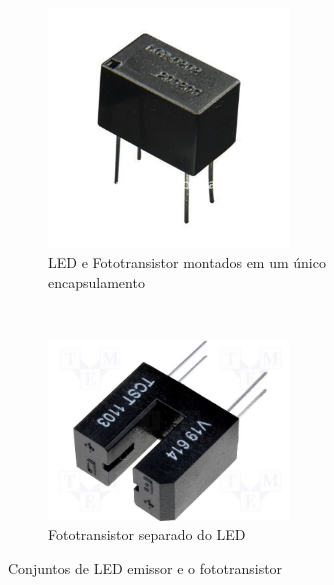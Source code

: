 \begin{figure}
        \centering
        \begin{subfigure}[b]{0.4\textwidth}
                \includegraphics[width=0.7\textwidth]{figuras/optoac.jpg}
                \caption{LED e Fototransistor montados em um único encapsulamento}
                \label{fig:fotoUni}
        \end{subfigure}%
        ~
        \begin{subfigure}[b]{0.4\textwidth}
                \includegraphics[width=0.7\textwidth]{figuras/opto_u.jpg}
                \caption{Fototransistor separado do LED}
                \label{fig:fotoLED}
        \end{subfigure}
        \caption{Conjuntos de LED emissor e o fototransistor}
        \label{fig:LED}
\end{figure}



